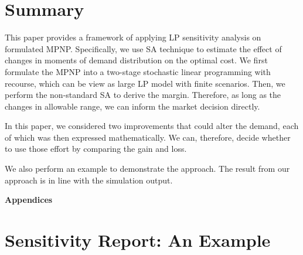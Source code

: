\documentclass[a4paper,11pt]{article}
\begin{document}
\section{Summary}
\label{se:conclusion}
This paper provides a framework of applying LP sensitivity analysis on formulated MPNP. Specifically, we use SA technique to estimate the effect of changes in moments of demand distribution on the optimal cost. We first formulate the MPNP into a two-stage stochastic linear programming with recourse, which can be view as large LP model with finite scenarios. Then, we perform the non-standard SA to derive the margin. Therefore, as long as the changes in allowable range, we can inform the market decision directly.

In this paper, we considered two improvements that could alter the demand, each of which was then expressed mathematically. We can, therefore, decide whether to use those effort by comparing the gain and loss.

We also perform an example to demonstrate the approach. The result from our approach is in line with the simulation output.

\printbibliography
\newpage
\begin{center}
{\bf\Large Appendices}
\end{center}

\appendix

\section{Sensitivity Report: An Example}
\label{se:report}
\end{document}
